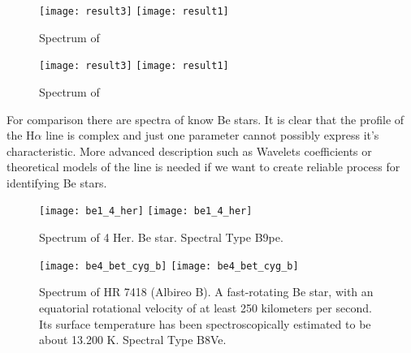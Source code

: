    \begin{figure}[!htbp]
      \begin{center}
        \leavevmode
        \ifpdf
        \texttt{[image: result3]}
        \else
        \texttt{[image: result1]}
        \fi
        \caption{Spectrum of }
        \label{FigResult3}
      \end{center}
    \end{figure}

   \begin{figure}[!htbp]
      \begin{center}
        \leavevmode
        \ifpdf
        \texttt{[image: result3]}
        \else
        \texttt{[image: result1]}
        \fi
        \caption{Spectrum of }
        \label{FigResult3}
      \end{center}
    \end{figure}


 
    For comparison there are spectra of know Be stars. It is clear
    that the profile of the H$\alpha$ line is complex and just one
    parameter cannot possibly express it's characteristic. More
    advanced description such as Wavelets coefficients or theoretical
    models of the line is needed if we want to create reliable
    process for identifying Be stars.

   \begin{figure}[!htbp]
      \begin{center}
        \leavevmode
        \ifpdf
        \texttt{[image: be1\_4\_her]}
        \else
        \texttt{[image: be1\_4\_her]}
        \fi
        \caption{Spectrum of 4 Her. Be star. Spectral Type B9pe.  }
        \label{FigBe1}
      \end{center}
    \end{figure}

   \begin{figure}[!htbp]
      \begin{center}
        \leavevmode
        \ifpdf
        \texttt{[image: be4\_bet\_cyg\_b]}
        \else
        \texttt{[image: be4\_bet\_cyg\_b]}
        \fi
        \caption{Spectrum of HR 7418 (Albireo B). A fast-rotating Be
          star, with an equatorial rotational velocity of at least 250
          kilometers per second. Its surface temperature has been
          spectroscopically estimated to be about 13.200 K. Spectral
          Type B8Ve. }
        \label{FigBe4}
      \end{center}
    \end{figure}

